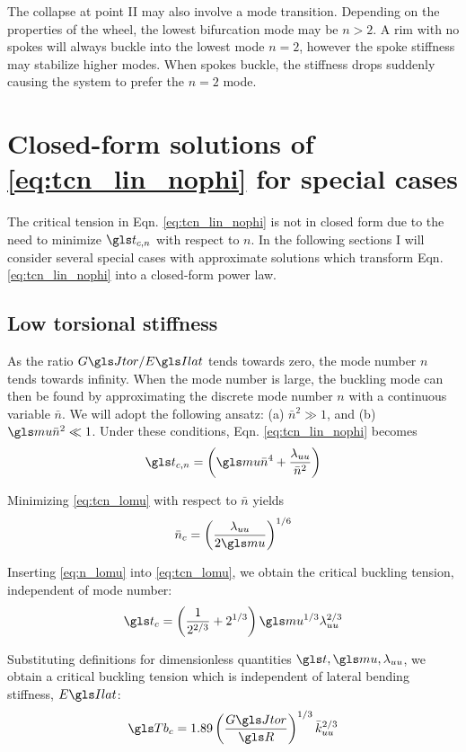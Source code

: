 \documentclass[\rootdir/thesis.tex]{subfiles}
\begin{document}
The collapse at point II may also involve a mode transition. Depending on the properties of the wheel, the lowest bifurcation mode may be $n>2$. A rim with no spokes will always buckle into the lowest mode $n=2$, however the spoke stiffness may stabilize higher modes. When spokes buckle, the stiffness drops suddenly causing the system to prefer the $n=2$ mode.


\section{Closed-form solutions of \eqref{eq:tcn_lin_nophi} for special cases}

The critical tension in Eqn. \eqref{eq:tcn_lin_nophi} is not in closed form due to the need to minimize $\ts_{c,n}$ with respect to $n$. In the following sections I will consider several special cases with approximate solutions which transform Eqn. \eqref{eq:tcn_lin_nophi} into a closed-form power law.

\subsection{Low torsional stiffness}
As the ratio $\GJ/\EIl$ tends towards zero, the mode number $n$ tends towards infinity. When the mode number is large, the buckling mode can then be found by approximating the discrete mode number $n$ with a continuous variable $\bar{n}$. We will adopt the following ansatz: (a) $\bar{n}^2 \gg 1$, and (b) $\m\bar{n}^2 \ll 1$. Under these conditions, Eqn. \eqref{eq:tcn_lin_nophi} becomes
\begin{equation}
\label{eq:tcn_lomu}
\ts_{c,n} = \left(\m \bar{n}^4 + \frac{\lr_{uu}}{\bar{n}^2}\right)
\end{equation}

Minimizing \eqref{eq:tcn_lomu} with respect to $\bar{n}$ yields
\begin{equation}
\label{eq:n_lomu}
\bar{n}_c=\left(\frac{\lr_{uu}}{2\m}\right)^{1/6}
\end{equation}

Inserting \eqref{eq:n_lomu} into \eqref{eq:tcn_lomu}, we obtain the critical buckling tension, independent of mode number:
\begin{equation}
\label{eq:tc_lomu}
\ts_c = \left(\frac{1}{2^{2/3}} + 2^{1/3}\right)\m^{1/3}\lr_{uu}^{2/3}
\end{equation}

Substituting definitions for dimensionless quantities $\ts,\m,\lr_{uu}$, we obtain a critical buckling tension which is independent of lateral bending stiffness, $\EIl$:
\begin{equation}
\label{eq:Tc_lo_mu}
\Tb_c = 1.89 \left( \frac{\GJ}{\R} \right)^{1/3} \kuu^{2/3}
\end{equation}
\end{document}
